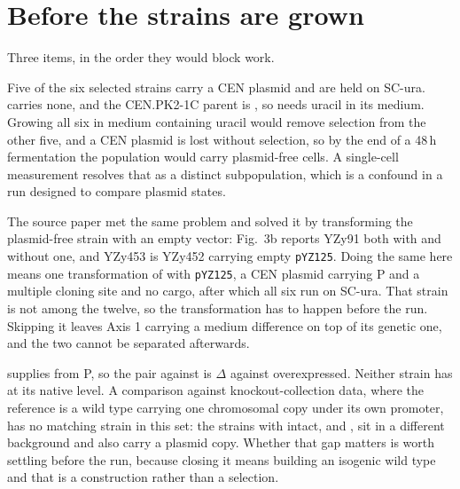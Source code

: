 
\section{Before the strains are grown}\label{sec:before}

Three items, in the order they would block work.

Five of the six selected strains carry a  CEN plasmid and are held on
SC-ura.  carries none, and the CEN.PK2-1C parent is
, so  needs uracil in its medium. Growing all six in
medium containing uracil would remove selection from the other five, and a CEN
plasmid is lost without selection, so by the end of a 48\,h fermentation the
population would carry plasmid-free cells. A single-cell measurement resolves
that as a distinct subpopulation, which is a confound in a run designed to
compare plasmid states.

The source paper met the same problem and solved it by transforming the
plasmid-free strain with an empty vector: Fig.~3b reports YZy91 both with and
without one, and YZy453 is YZy452 carrying empty \texttt{pYZ125}. Doing the same
here means one transformation of  with \texttt{pYZ125}, a CEN
 plasmid carrying P and a multiple cloning site and no
cargo, after which all six run on SC-ura. That strain is not among the twelve, so
the transformation has to happen before the run. Skipping it leaves Axis 1
carrying a medium difference on top of its genetic one, and the two cannot be
separated afterwards.

 supplies  from P, so the pair
 against  is $\Delta$ against
 overexpressed. Neither strain has  at its native level. A
comparison against knockout-collection data, where the reference is a wild type
carrying one chromosomal copy under its own promoter, has no matching strain in
this set: the strains with  intact,  and ,
sit in a different background and also carry a plasmid copy. Whether that gap
matters is worth settling before the run, because closing it means building an
isogenic  wild type and that is a construction rather than a
selection.

